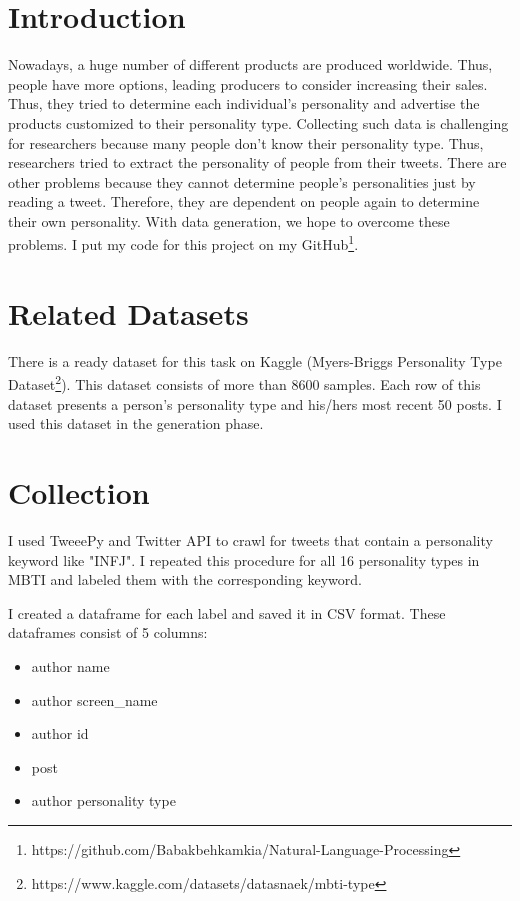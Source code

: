 \section{Introduction}
Nowadays, a huge number of different products are produced worldwide. Thus, people have more options, leading producers to consider increasing their sales. Thus, they tried to determine each individual's personality and advertise the products customized to their personality type. 
Collecting such data is challenging for researchers because many people don't know their personality type. Thus, researchers tried to extract the personality of people from their tweets. There are other problems because they cannot determine people's personalities just by reading a tweet. Therefore, they are dependent on people again to determine their own personality.
With data generation, we hope to overcome these problems. I put my code for this project on my GitHub\footnote{https://github.com/Babakbehkamkia/Natural-Language-Processing}.



\section{Related Datasets}
There is a ready dataset for this task on Kaggle (Myers-Briggs Personality Type Dataset\footnote{https://www.kaggle.com/datasets/datasnaek/mbti-type}). This dataset consists of more than 8600 samples. Each row of this dataset presents a person's personality type and his/hers most recent 50 posts. I used this dataset in the generation phase.

\section{Collection}
I used TweeePy and Twitter API to crawl for tweets that contain a personality keyword like "INFJ". I repeated this procedure for all 16 personality types in MBTI and labeled them with the corresponding keyword.

I created a dataframe for each label and saved it in CSV format. These dataframes consist of 5 columns:
\begin{itemize}
    \item author name
    \item author screen\_name
    \item author id
    \item post
    \item author personality type
\end{itemize}

